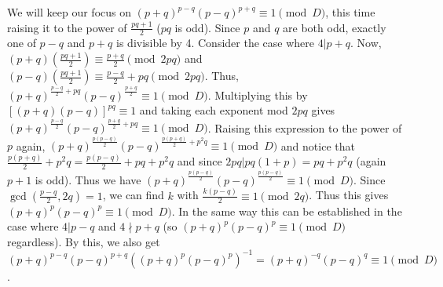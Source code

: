 \documentclass[11pt,a4paper]{article}
\begin{document}
\begin{enumerate}
    We will keep our focus on $(p+q)^{p-q}(p-q)^{p+q}\equiv 1\pmod{D}$, this time raising it to the power of $\frac{pq+1}{2}$ ($pq$ is odd). Since $p$ and $q$ are both odd, exactly one of $p-q$ and $p+q$ is divisible by 4. Consider the case where $4|p+q$. Now, $(p+q)(\frac{pq+1}{2})
    \equiv \frac{p+q}{2}\pmod{2pq}$ and $(p-q)(\frac{pq+1}{2})
    \equiv \frac{p-q}{2}+pq\pmod{2pq}$. Thus, 
    $(p+q)^{\frac{p-q}{2}+pq}(p-q)^{\frac{p+q}{2}}\equiv 1\pmod{D}$. Multiplying this by $[(p+q)(p-q)]^{pq}\equiv 1$ and taking each exponent mod $2pq$ gives 
    $(p+q)^{\frac{p-q}{2}}(p-q)^{\frac{p+q}{2} + pq}\equiv 1\pmod{D}$. Raising this expression to the power of $p$ again, $(p+q)^{\frac{p(p-q)}{2}}(p-q)^{\frac{p(p+q)}{2} + p^2q}\equiv 1\pmod{D}$ and notice that $\frac{p(p+q)}{2} + p^2q= \frac{p(p-q)}{2}+pq+p^2q$ and since $2pq|pq(1+p)=pq+p^2q$ (again $p+1$ is odd). Thus we have $(p+q)^{\frac{p(p-q)}{2}}(p-q)^{\frac{p(p-q)}{2}}\equiv 1\pmod{D}$. 
    Since $\gcd(\frac{p-q}{2}, 2q)=1$, we can find $k$ with $\frac{k(p-q)}{2}\equiv 1\pmod {2q}$. Thus this gives $(p+q)^{p}(p-q)^{p}\equiv 1\pmod{D}$. In the same way this can be established in the case where $4|p-q$ and $4\nmid p+q$ (so $(p+q)^{p}(p-q)^{p}\equiv 1\pmod{D}$ regardless). By this, we also get $(p+q)^{p-q}(p-q)^{p+q} ((p+q)^{p}(p-q)^{p})^{-1}=(p+q)^{-q}(p-q)^{q}\equiv 1\pmod{D}$. 
	\end{enumerate}
\end{document}
